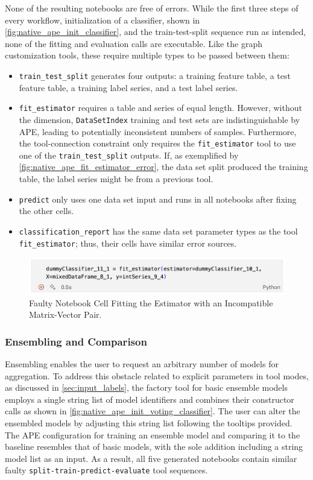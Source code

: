 None of the resulting notebooks are free of errors. While the first three steps of every workflow, initialization of a classifier, shown in \autoref{fig:native_ape_init_classifier}, and the train-test-split sequence run as intended, none of the fitting and evaluation calls are executable. Like the graph customization tools, these require multiple types to be passed between them:
\begin{itemize}
    \item \verb|train_test_split| generates four outputs: a training feature table, a test feature table, a training label series, and a test label series.
    \item \verb|fit_estimator| requires a table and series of equal length. However, without the dimension, \verb|DataSetIndex| training and test sets are indistinguishable by APE, leading to potentially inconsistent numbers of samples. Furthermore, the tool-connection constraint only requires the \verb|fit_estimator| tool to use one of the \verb|train_test_split| outputs. If, as exemplified by \autoref{fig:native_ape_fit_estimator_error}, the data set split produced the training table, the label series might be from a previous tool.
    \item \verb|predict| only uses one data set input and runs in all notebooks after fixing the other cells.
    \item \verb|classification_report| has the same data set parameter types as the tool \verb|fit_estimator|; thus, their cells have similar error sources.
\end{itemize}
\begin{figure}
    \centering
    \includegraphics[width=0.5\linewidth]{Tex//images//native_ape_eval//fit_estimator.png}
    \caption{Faulty Notebook Cell Fitting the Estimator with an Incompatible Matrix-Vector Pair.}
    \label{fig:native_ape_fit_estimator_error}
\end{figure}

\subsubsection{Ensembling and Comparison}

Ensembling enables the user to request an arbitrary number of models for aggregation. To address this obstacle related to explicit parameters in tool modes, as discussed in \autoref{sec:input_labels}, the factory tool for basic ensemble models employs a single string list of model identifiers and combines their constructor calls as shown in \autoref{fig:native_ape_init_voting_classifier}. The user can alter the ensembled models by adjusting this string list following the tooltips provided. The APE configuration for training an ensemble model and comparing it to the baseline resembles that of basic models, with the sole addition including a string model list as an input. As a result, all five generated notebooks contain similar faulty \verb|split-train-predict-evaluate| tool sequences.

